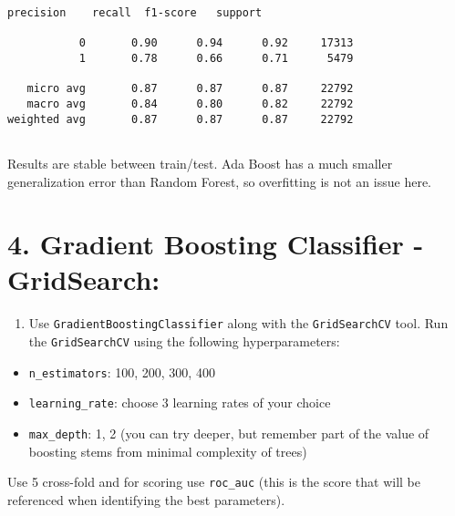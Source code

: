 \documentclass[11pt]{article}
\providecommand{\tightlist}{%
      \setlength{\itemsep}{0pt}\setlength{\parskip}{0pt}}
\begin{document}
    \begin{Verbatim}[commandchars=\\\{\}]
              precision    recall  f1-score   support

           0       0.90      0.94      0.92     17313
           1       0.78      0.66      0.71      5479

   micro avg       0.87      0.87      0.87     22792
   macro avg       0.84      0.80      0.82     22792
weighted avg       0.87      0.87      0.87     22792


    \end{Verbatim}

    Results are stable between train/test. Ada Boost has a much smaller
generalization error than Random Forest, so overfitting is not an issue
here.

    \hypertarget{gradient-boosting-classifier---gridsearch}{%
\section{4. Gradient Boosting Classifier -
GridSearch:}\label{gradient-boosting-classifier---gridsearch}}

\begin{enumerate}
\def\labelenumi{\alph{enumi})}
\tightlist
\item
  Use \texttt{GradientBoostingClassifier} along with the
  \texttt{GridSearchCV} tool. Run the \texttt{GridSearchCV} using the
  following hyperparameters:
\end{enumerate}

\begin{itemize}
\item
  \texttt{n\_estimators}: 100, 200, 300, 400
\item
  \texttt{learning\_rate}: choose 3 learning rates of your choice
\item
  \texttt{max\_depth}: 1, 2 (you can try deeper, but remember part of
  the value of boosting stems from minimal complexity of trees)
\end{itemize}

Use 5 cross-fold and for scoring use \texttt{roc\_auc} (this is the
score that will be referenced when identifying the best parameters).
\end{document}
